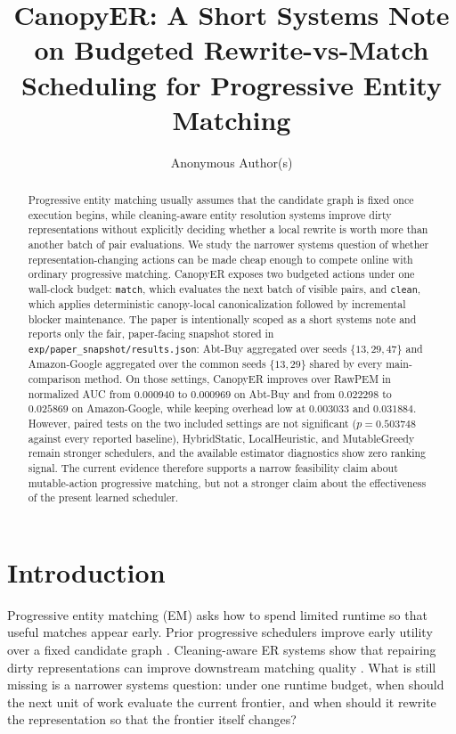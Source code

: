 \documentclass{article}
\title{CanopyER: A Short Systems Note on Budgeted Rewrite-vs-Match Scheduling for Progressive Entity Matching}
\author{Anonymous Author(s)}
\newcommand{\method}{CanopyER}
\newcommand{\nauc}{normalized AUC}
\newcommand{\matcha}{\texttt{match}}
\newcommand{\cleana}{\texttt{clean}}
\begin{document}
\maketitle

\begin{abstract}
Progressive entity matching usually assumes that the candidate graph is fixed once execution begins, while cleaning-aware entity resolution systems improve dirty representations without explicitly deciding whether a local rewrite is worth more than another batch of pair evaluations. We study the narrower systems question of whether representation-changing actions can be made cheap enough to compete online with ordinary progressive matching. \method{} exposes two budgeted actions under one wall-clock budget: \matcha{}, which evaluates the next batch of visible pairs, and \cleana{}, which applies deterministic canopy-local canonicalization followed by incremental blocker maintenance. The paper is intentionally scoped as a short systems note and reports only the fair, paper-facing snapshot stored in \texttt{exp/paper\_snapshot/results.json}: Abt-Buy aggregated over seeds $\{13,29,47\}$ and Amazon-Google aggregated over the common seeds $\{13,29\}$ shared by every main-comparison method. On those settings, \method{} improves over RawPEM in \nauc{} from $0.000940$ to $0.000969$ on Abt-Buy and from $0.022298$ to $0.025869$ on Amazon-Google, while keeping overhead low at $0.003033$ and $0.031884$. However, paired tests on the two included settings are not significant ($p=0.503748$ against every reported baseline), HybridStatic, LocalHeuristic, and MutableGreedy remain stronger schedulers, and the available estimator diagnostics show zero ranking signal. The current evidence therefore supports a narrow feasibility claim about mutable-action progressive matching, but not a stronger claim about the effectiveness of the present learned scheduler.
\end{abstract}

\section{Introduction}

Progressive entity matching (EM) asks how to spend limited runtime so that useful matches appear early. Prior progressive schedulers improve early utility over a fixed candidate graph \citep{altowim2018progresser,sun2022costbenefit,maciejewski2025progressive}. Cleaning-aware ER systems show that repairing dirty representations can improve downstream matching quality \citep{buoncristiano2024detective,ao2019effective}. What is still missing is a narrower systems question: under one runtime budget, when should the next unit of work evaluate the current frontier, and when should it rewrite the representation so that the frontier itself changes?
\end{document}
